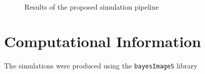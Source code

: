 \documentclass[journal]{IEEEtran}
\begin{document}
\begin{figure}[hbt]
\centering
{}\\
\caption{Results of the proposed simulation pipeline}\label{fig:Pipeline}
\end{figure}

\appendix

\section{Computational Information}

The simulations were produced using the \verb|bayesImageS| library



\end{document}
